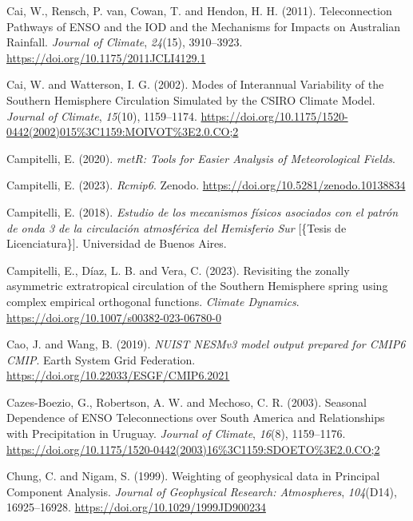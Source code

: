 \documentclass[12pt,oneside,a4paper]{reedthesis}
\newlength{\cslhangindent}
\newenvironment{CSLReferences}[2] %
 {%
  \setlength{\parindent}{0pt}
  \ifodd #1 \everypar{\setlength{\hangindent}{\cslhangindent}}\ignorespaces\fi
  \ifnum #2 > 0
  \setlength{\parskip}{#2\baselineskip}
  \fi
 }%
 {}
\begin{document}
\begin{CSLReferences}{1}{0}
\leavevmode{}%
Cai, W., Rensch, P. van, Cowan, T. and Hendon, H. H. (2011). Teleconnection {Pathways} of {ENSO} and the {IOD} and the {Mechanisms} for {Impacts} on {Australian Rainfall}. \emph{Journal of Climate}, \emph{24}(15), 3910--3923. \url{https://doi.org/10.1175/2011JCLI4129.1}

\leavevmode{}%
Cai, W. and Watterson, I. G. (2002). Modes of {Interannual Variability} of the {Southern Hemisphere Circulation Simulated} by the {CSIRO Climate Model}. \emph{Journal of Climate}, \emph{15}(10), 1159--1174. \url{https://doi.org/10.1175/1520-0442(2002)015\%3C1159:MOIVOT\%3E2.0.CO;2}

\leavevmode{}%
Campitelli, E. (2020). \emph{{metR}: {Tools} for {Easier Analysis} of {Meteorological Fields}}.

\leavevmode{}%
Campitelli, E. (2023). \emph{Rcmip6}. Zenodo. \url{https://doi.org/10.5281/zenodo.10138834}

\leavevmode{}%
Campitelli, E. (2018). \emph{{Estudio de los mecanismos f{í}sicos asociados con el patr{ó}n de onda 3 de la circulaci{ó}n atmosf{é}rica del Hemisferio Sur}} {[}\{Tesis de Licenciatura\}{]}. Universidad de Buenos Aires.

\leavevmode{}%
Campitelli, E., Díaz, L. B. and Vera, C. (2023). Revisiting the zonally asymmetric extratropical circulation of the {Southern Hemisphere} spring using complex empirical orthogonal functions. \emph{Climate Dynamics}. \url{https://doi.org/10.1007/s00382-023-06780-0}

\leavevmode{}%
Cao, J. and Wang, B. (2019). \emph{NUIST NESMv3 model output prepared for CMIP6 CMIP}. Earth System Grid Federation. \url{https://doi.org/10.22033/ESGF/CMIP6.2021}

\leavevmode{}%
Cazes-Boezio, G., Robertson, A. W. and Mechoso, C. R. (2003). Seasonal {Dependence} of {ENSO Teleconnections} over {South America} and {Relationships} with {Precipitation} in {Uruguay}. \emph{Journal of Climate}, \emph{16}(8), 1159--1176. \url{https://doi.org/10.1175/1520-0442(2003)16\%3C1159:SDOETO\%3E2.0.CO;2}

\leavevmode{}%
Chung, C. and Nigam, S. (1999). Weighting of geophysical data in {Principal Component Analysis}. \emph{Journal of Geophysical Research: Atmospheres}, \emph{104}(D14), 16925--16928. \url{https://doi.org/10.1029/1999JD900234}


\end{CSLReferences}
\end{document}
